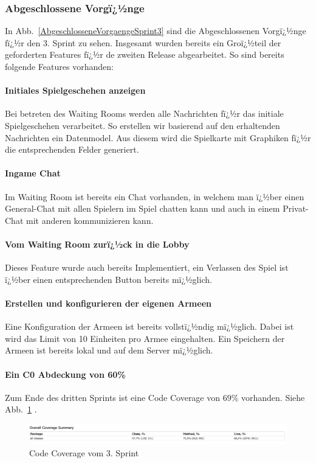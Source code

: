 \documentclass[12pt, titlepage]{scrartcl}
\newcommand{\Abb}[1]{%
	Abb.\ \ref{#1}%
}
\begin{document}
		\subsubsection{Abgeschlossene Vorgï¿½nge}
		
		In \Abb{AbgeschlosseneVorgaengeSprint3} sind die Abgeschlossenen Vorgï¿½nge fï¿½r den 3. Sprint zu sehen. Insgesamt wurden bereits ein Groï¿½teil der geforderten Features fï¿½r de zweiten Release abgearbeitet. So sind bereits folgende Features vorhanden:
		
		\paragraph{Initiales Spielgeschehen anzeigen} Bei betreten des Waiting Rooms werden alle Nachrichten fï¿½r das initiale Spielgeschehen verarbeitet. So erstellen wir basierend auf den erhaltenden Nachrichten ein Datenmodel. Aus diesem wird die Spielkarte mit Graphiken fï¿½r die entsprechenden Felder generiert.
		
		\paragraph{Ingame Chat}
		Im Waiting Room ist bereits ein Chat vorhanden, in welchem man ï¿½ber einen General-Chat mit allen Spielern im Spiel chatten kann und auch in einem Privat-Chat mit anderen kommunizieren kann.
		
		\paragraph{Vom Waiting Room zurï¿½ck in die Lobby}
		Dieses Feature wurde auch bereits Implementiert, ein Verlassen des Spiel ist ï¿½ber einen entsprechenden Button bereits mï¿½glich.
		
		\paragraph{Erstellen und konfigurieren der eigenen Armeen}
		Eine Konfiguration der Armeen ist bereits vollstï¿½ndig mï¿½glich. Dabei ist wird das Limit von 10 Einheiten pro Armee eingehalten. Ein Speichern der Armeen ist bereits lokal und auf dem Server mï¿½glich.
		
		\paragraph{Ein C0 Abdeckung von 60\%}
		Zum Ende des dritten Sprints ist eine Code Coverage von 69\% vorhanden. Siehe \Abb{CodeCoverageSprint3}.
		\begin{figure}[H] 
			\centering
			\includegraphics[width=1\textwidth]{Coverage_Sprint_3.PNG}
			\caption{Code Coverage vom 3. Sprint}
			\label{CodeCoverageSprint3}
		\end{figure}
		
\end{document}
